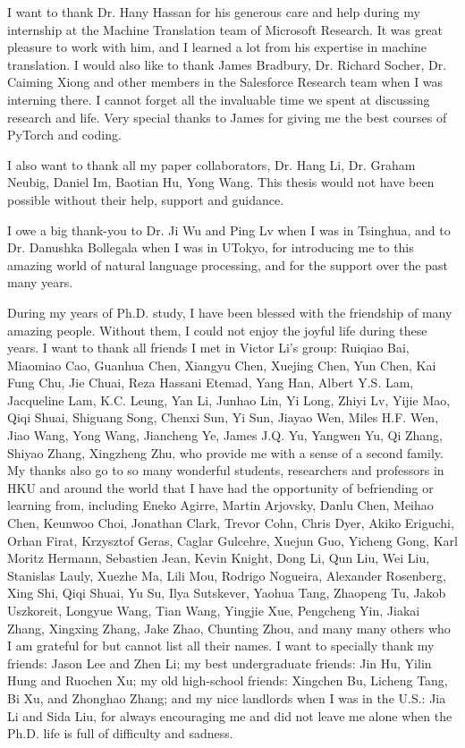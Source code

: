  I want to thank Dr. Hany Hassan for his generous care and help during my internship at the Machine Translation team of Microsoft Research. 
 It was great pleasure to work with him, and I learned a lot from his expertise in machine translation. 
 I would also like to thank James Bradbury, Dr. Richard Socher, Dr. Caiming Xiong and other members in the Salesforce Research team when I was interning there. I cannot forget all the invaluable time we spent at discussing research and life. Very special thanks to James for giving me the best courses of PyTorch and coding.
 
 I also want to thank all my paper collaborators, 
 Dr. Hang Li, 
 Dr. Graham Neubig, 
 Daniel Im,
 Baotian Hu,
 Yong Wang.
 This thesis would not have been possible without their help, support and guidance.
 
I owe a big thank-you to Dr. Ji Wu and Ping Lv when I was in Tsinghua, and to Dr. Danushka Bollegala when I was  in UTokyo, for introducing me to this amazing world of natural language processing, and for the support over the past many years.
 
During my years of Ph.D. study, I have been blessed with the friendship of many amazing people. Without them, I could not enjoy the joyful life during these years.
I want to thank all friends I met in Victor Li's group:
Ruiqiao Bai,
Miaomiao Cao,
Guanhua Chen,
Xiangyu Chen,
Xuejing Chen,
Yun Chen,
Kai Fung Chu,
Jie Chuai,
Reza Hassani Etemad,
Yang Han,
Albert Y.S. Lam,
Jacqueline Lam,
K.C. Leung,
Yan Li,
Junhao Lin,
Yi Long,
Zhiyi Lv,
Yijie Mao,
Qiqi Shuai,
Shiguang Song,
Chenxi Sun,
Yi Sun,
Jiayao Wen,
 Miles H.F. Wen,
Jiao Wang,
Yong Wang,
Jiancheng Ye,
James J.Q. Yu,
Yangwen Yu,
Qi Zhang,
Shiyao Zhang,
Xingzheng Zhu,
who provide me with a sense of a second family.
My thanks also go to so many wonderful students, researchers and professors in HKU and around the world that I have had the opportunity of befriending or learning from, including
Eneko Agirre,
Martin Arjovsky,
Danlu Chen,
Meihao Chen,
Keunwoo Choi,
Jonathan Clark,
Trevor Cohn,
Chris Dyer,
Akiko Eriguchi,
Orhan Firat,
Krzysztof Geras,
Caglar Gulcehre,
Xuejun Guo,
Yicheng Gong,
Karl Moritz Hermann,
Sebastien Jean,
Kevin Knight,
Dong Li,
Qun Liu,
Wei Liu,
Stanislas Lauly,
Xuezhe Ma,
Lili Mou,
Rodrigo Nogueira,
Alexander Rosenberg,
Xing Shi,
Qiqi Shuai,
Yu Su,
Ilya Sutskever,
Yaohua Tang,
Zhaopeng Tu,
Jakob Uszkoreit,
Longyue Wang,
Tian Wang,
Yingjie Xue,
Pengcheng Yin,
Jiakai Zhang,
Xingxing Zhang,
Jake Zhao,
Chunting Zhou,
 and many many others who I am grateful for but cannot list all their names. 
I want to specially thank my friends: Jason Lee and Zhen Li;
my best undergraduate friends: Jin Hu,  Yilin Hung and Ruochen Xu;
my old high-school friends: Xingchen Bu,  Licheng Tang, Bi Xu, and  Zhonghao Zhang;
and my nice landlords when I was in the U.S.: Jia Li and Sida Liu,
 for always encouraging me and did not leave me alone when the Ph.D. life is full of difficulty and sadness.


